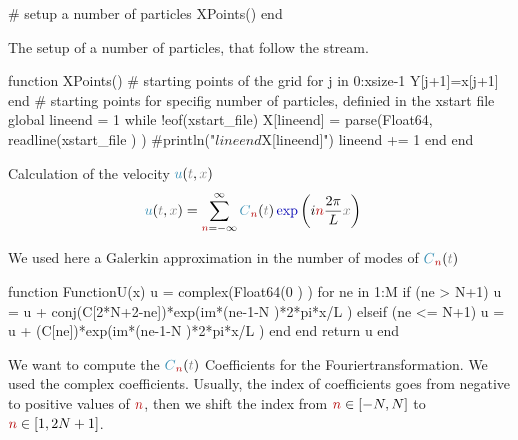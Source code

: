 \documentclass[10pt,fleqn, %
reqno,a4paper]{article}
\makeatletter
\def\mathcolor#1#{\@mathcolor{#1}}
\def\@mathcolor#1#2#3{%
        \protect\leavevmode
        \begingroup\color#1{#2}#3\endgroup
}
\newcommand{\nx}{\mathcolor{gray}{x}}
\newcommand{\nt}{\mathcolor{gray}{t}}
\newcommand{\nnu}{\mathcolor{cyan!70!black}{u}}
\newcommand{\nexp}{\mathcolor{blue!70!black}{\exp}}
\newcommand{\nn}{\mathcolor{red!70!black}{n}}
\newcommand{\dif}{\mathrm{\mathcolor{blue!70!black}{d } } }
\newcommand{\nC}{\mathcolor{cyan!70!black}{C}}
\makeatother
\begin{document}
   # setup a number of particles 
   XPoints()
end

\nwendcode{}\nwdocspar
The setup of a number of particles, that follow the stream. 

\nwenddocs{}\endmoddef\nwstartdeflinemarkup{}\nwenddeflinemarkup
function XPoints()
   # starting points of the grid
   for j in 0:xsize-1
      Y[j+1]=x[j+1]
   end
   # starting points for specifig number of particles, definied in the xstart file
   global lineend = 1
   while !eof(xstart_file)
     X[lineend] = parse(Float64, readline(xstart_file ) )
     #println("$lineend $X[lineend]")
     lineend += 1
   end
end

\nwendcode{}\nwdocspar

Calculation of the velocity $\nnu (\nt, \nx)$ 
\begin{align*}
        \nnu (\nt, \nx) &= \sum_{\nn=-\infty}^{\infty} \nC_{\nn}(\nt) \nexp \left( i\nn \frac{2\pi}{L} \nx \right) 
\end{align*}

We used here a Galerkin approximation in the number of modes of $\nC_{\nn} (\nt)$

\nwenddocs{}\endmoddef\nwstartdeflinemarkup{}\nwenddeflinemarkup
function FunctionU(x)
   u = complex(Float64(0 ) )
   for ne in 1:M
         if (ne > N+1)
            u = u + conj(C[2*N+2-ne])*exp(im*(ne-1-N )*2*pi*x/L )
         elseif (ne <= N+1)
            u = u + (C[ne])*exp(im*(ne-1-N )*2*pi*x/L )
         end
      end
   return u
end

\nwendcode{}\nwdocspar
We want to compute the $\nC_{\nn} (\nt)  $ Coefficients for the Fouriertransformation. We used the complex coefficients. Usually, the index of coefficients goes from negative to positive values of $ \nn $, then we shift the index from $ \nn \in [-N,N] $ to $ \nn \in [1,2N+1] $.
\end{document}

